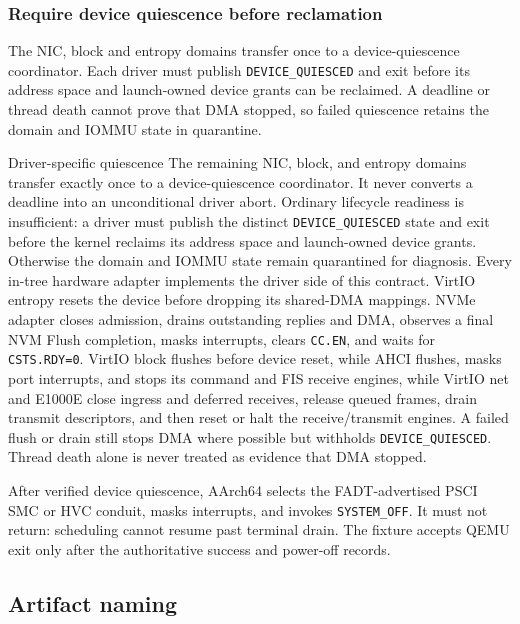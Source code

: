 \subsubsection{Require device quiescence before reclamation}

The NIC, block and entropy domains transfer once to a device-quiescence
coordinator. Each driver must publish \texttt{DEVICE\_QUIESCED} and exit before
its address space and launch-owned device grants can be reclaimed. A deadline
or thread death cannot prove that DMA stopped, so failed quiescence retains the
domain and IOMMU state in quarantine.

\begin{implementationdetail}{Driver-specific quiescence}
The remaining NIC, block, and entropy domains transfer exactly once to a
device-quiescence coordinator. It never converts a deadline into an
unconditional driver abort. Ordinary lifecycle readiness is insufficient: a
driver must publish the distinct \texttt{DEVICE\_QUIESCED} state and exit before
the kernel reclaims its address space and launch-owned device grants. Otherwise
the domain and IOMMU state remain quarantined for diagnosis. Every in-tree
hardware adapter implements the driver side of this contract. VirtIO entropy
resets the device before dropping its shared-DMA mappings. NVMe
adapter closes admission, drains outstanding replies and DMA, observes a final
NVM Flush completion, masks interrupts, clears \texttt{CC.EN}, and waits for
\texttt{CSTS.RDY=0}. VirtIO block flushes before device reset, while AHCI flushes,
masks port interrupts, and stops its command and FIS receive engines, while VirtIO
net and E1000E close ingress and deferred receives, release queued frames,
drain transmit descriptors, and then reset or halt the receive/transmit
engines. A failed flush or drain still stops DMA where possible but withholds
\texttt{DEVICE\_QUIESCED}. Thread death alone is never treated as evidence
that DMA stopped.
\end{implementationdetail}

After verified device quiescence, AArch64 selects the FADT-advertised PSCI SMC
or HVC conduit, masks interrupts, and invokes \texttt{SYSTEM\_OFF}. It must not
return: scheduling cannot resume past terminal drain. The fixture accepts QEMU
exit only after the authoritative success and power-off records.

\subsection{Artifact naming}

